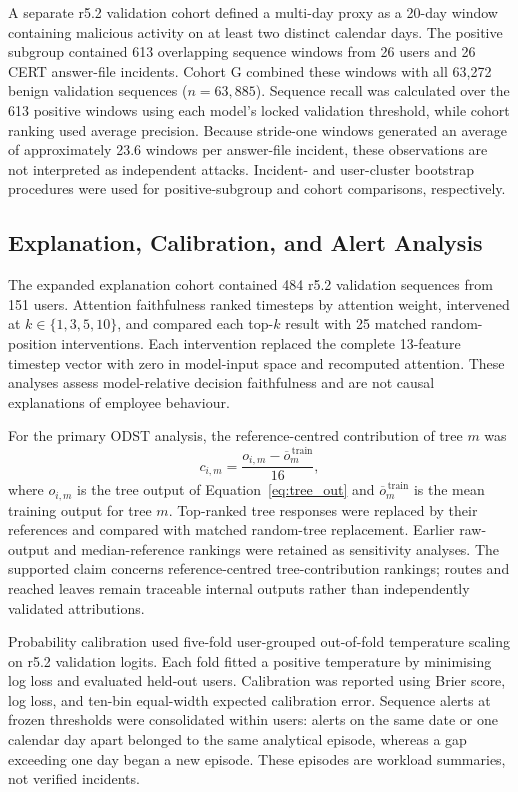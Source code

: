 \smallskip
A separate r5.2 validation cohort defined a multi-day proxy as a 20-day
window containing malicious activity on at least two distinct calendar
days. The positive subgroup contained 613 overlapping sequence windows
from 26 users and 26 CERT answer-file incidents. Cohort G combined these
windows with all 63,272 benign validation sequences
(\(n=63,885\)). Sequence recall was calculated over the 613 positive
windows using each model's locked validation threshold, while cohort
ranking used average precision. Because stride-one windows generated an
average of approximately 23.6 windows per answer-file incident, these
observations are not interpreted as independent attacks. Incident- and
user-cluster bootstrap procedures were used for positive-subgroup and
cohort comparisons, respectively.

\subsection{Explanation, Calibration, and Alert Analysis}
\label{subsec:explanation_method}
The expanded explanation cohort contained 484 r5.2 validation sequences
from 151 users. Attention faithfulness ranked timesteps by attention weight,
intervened at \(k\in\{1,3,5,10\}\), and compared each top-\(k\) result with
25 matched random-position interventions. Each intervention replaced the
complete 13-feature timestep vector with zero in model-input space and
recomputed attention. These analyses assess model-relative decision
faithfulness and are not causal explanations of employee behaviour.

\smallskip
For the primary ODST analysis, the reference-centred contribution of tree
\(m\) was
\begin{equation}
c_{i,m}
=
\frac{
o_{i,m}-\overline{o}^{\,\mathrm{train}}_m
}{16},
\label{eq:tree_contribution}
\end{equation}
where \(o_{i,m}\) is the tree output of Equation~\eqref{eq:tree_out} and
\(\overline{o}^{\,\mathrm{train}}_m\) is the mean training output for tree
\(m\). Top-ranked tree responses were replaced by their references and
compared with matched random-tree replacement. Earlier raw-output and
median-reference rankings were retained as sensitivity analyses. The
supported claim concerns reference-centred tree-contribution rankings;
routes and reached leaves remain traceable internal outputs rather than
independently validated attributions.

\smallskip
Probability calibration used five-fold user-grouped out-of-fold temperature
scaling on r5.2 validation logits. Each fold fitted a positive temperature
by minimising log loss and evaluated held-out users. Calibration was
reported using Brier score, log loss, and ten-bin equal-width expected
calibration error. Sequence alerts at frozen thresholds were consolidated
within users: alerts on the same date or one calendar day apart belonged
to the same analytical episode, whereas a gap exceeding one day began a
new episode. These episodes are workload summaries, not verified incidents.

